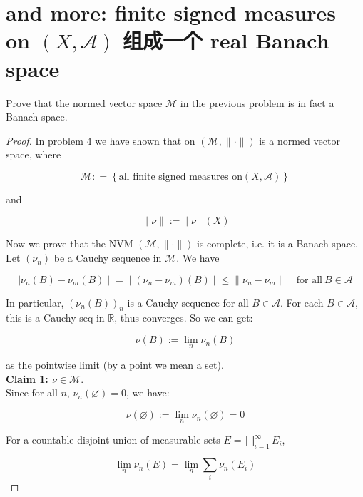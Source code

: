 \documentclass{qlnotes-export}
\begin{document}
\section{\texorpdfstring{and more: finite signed measures on \((X,\mathcal{A})\) 组成一个 real Banach space}{and more: finite signed measures on (X,\textbackslash mathcal\{A\}) 组成一个 real Banach space}}\label{and-more-finite-signed-measures-on-xmathcala-ux7ec4ux6210ux4e00ux4e2a-real-banach-space}

Prove that the normed vector space \(\mathcal{M}\) in the previous problem is in fact a Banach space.

\begin{proof}

In problem 4 we have shown that on \((\mathcal{M}, \parallel \cdot \parallel )\) is a normed vector space, where

\[\mathcal{M}: = \left\{ {\text{all finite signed measures on}(X,\mathcal{A})} \right\}\]

and

\[\left. \parallel \nu \parallel := \middle| \nu \middle| (X) \right.\]

Now we prove that the NVM \((\mathcal{M}, \parallel \cdot \parallel )\) is complete, i.e. it is a Banach space.\\
Let \((\nu_{n})\) be a Cauchy sequence in \(\mathcal{M}\). We have

\[\left. |\nu_{n}(B) - \nu_{m}(B) \middle| = \middle| (\nu_{n} - \nu_{m})(B) \middle| \leq \parallel \nu_{n} - \nu_{m} \parallel \quad\text{for all}\ B \in \mathcal{A} \right.\]

In particular, \((\nu_{n}(B))_{n}\) is a Cauchy sequence for all \(B \in \mathcal{A}\). For each \(B \in \mathcal{A}\), this is a Cauchy seq in \(\mathbb{R}\), thus converges. So we can get:

\[\nu(B) := \lim\limits_{n}\nu_{n}(B)\]

as the pointwise limit (by a point we mean a set).\\
\textbf{Claim 1: \(\nu \in \mathcal{M}\)}.\\
Since for all \(n\), \(\nu_{n}(\varnothing) = 0\), we have:

\[\nu(\varnothing) := \lim\limits_{n}\nu_{n}(\varnothing) = 0\]

For a countable disjoint union of measurable sets \(E = \bigsqcup_{i = 1}^{\infty}E_{i}\),

\[\lim\limits_{n}\nu_{n}(E) = \lim\limits_{n}\sum\limits_{i}\nu_{n}(E_{i})\]


\end{proof}
\end{document}
